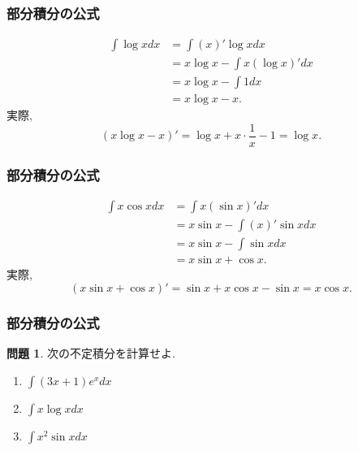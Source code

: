 \documentclass[dvipdfmx,cjk,10.2pt]{beamer}
\theoremstyle{definition}
\newtheorem{Prob}[Thm]{問題}
\begin{document}



\begin{frame}
\frametitle{部分積分の公式}

\begin{align*}
\int \log x dx & = \int (x)'\log x dx \\
& = x \log x -\int x(\log x)'dx \\
&= x \log x - \int 1 dx \\
& = x\log x -x.  
\end{align*}
実際, 
$$
(x\log x -x)' = \log x + x \cdot \frac{1}{x}-1=\log x. 
$$


\end{frame}





\begin{frame}
\frametitle{部分積分の公式}

\begin{align*}
\int x \cos x dx & = \int x(\sin x)' dx\\
& = x \sin x - \int (x)' \sin x dx \\
& = x \sin x - \int \sin x dx \\
&= x \sin x + \cos x. 
\end{align*}
実際,
$$
(x \sin x + \cos x)' = \sin x + x \cos x -\sin x=x \cos x. 
$$

\end{frame}





\begin{frame}
\frametitle{部分積分の公式}

\begin{Prob}
次の不定積分を計算せよ. 
\begin{enumerate}
\item $\int (3x+1)e^{x}dx$
\item $\int x \log x dx$
\item $\int x^2 \sin x dx$
\end{enumerate}
\end{Prob}

\end{frame}
\end{document}
